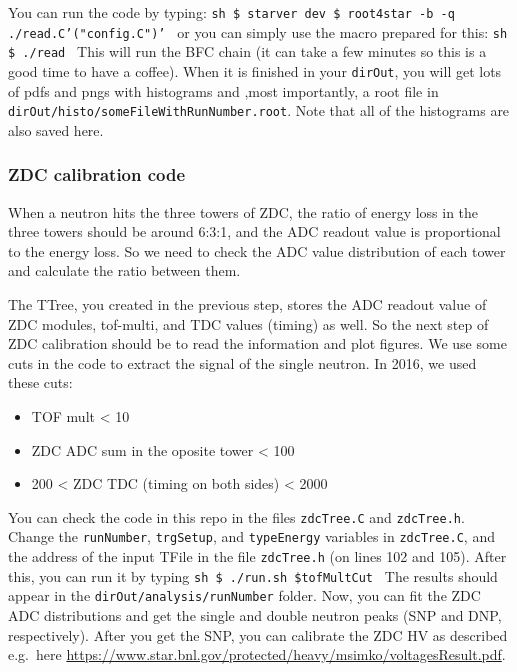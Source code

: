 You can run the code by typing:
\texttt{sh
\$ starver dev
\$ root4star -b -q ./read.C'("config.C")'
}
or you can simply use the macro prepared for this:
\texttt{sh
\$ ./read
}
This will run the BFC chain (it can take a few minutes so this is a good time to have a coffee). When it is finished
in your \texttt{dirOut}, you will get lots of pdfs and pngs with histograms and ,most importantly, a root file in
\texttt{dirOut/histo/someFileWithRunNumber.root}. Note that all of the histograms are also saved here.

\subsubsection{ZDC calibration code}\hypertarget{zdc-calibration-code}{}\label{zdc-calibration-code}

When a neutron hits the three towers of ZDC, the ratio of energy loss in the three towers should be 
around 6:3:1, and the ADC readout value is proportional to the energy loss. So we need to check the ADC value 
distribution of each tower and calculate the ratio between them.

The TTree, you created in the previous step, stores the ADC readout value of ZDC modules, tof-multi, and
TDC values (timing) as well. 
So the next step of ZDC calibration
should be to read the information and plot figures.
We use some cuts in the code to extract the signal of the single neutron. In 2016, we used these cuts:

\begin{itemize}
\item TOF mult \textless{} 10
\item ZDC ADC sum in the oposite tower \textless{} 100
\item 200 \textless{} ZDC TDC (timing on both sides) \textless{} 2000
\end{itemize}

You can check the code in this repo in the files
\texttt{zdcTree.C} and \texttt{zdcTree.h}. Change the \texttt{runNumber}, \texttt{trgSetup}, and \texttt{typeEnergy} variables in \texttt{zdcTree.C}, and
the address of the input TFile in the file \texttt{zdcTree.h} (on lines 102 and 105). After this, you can run it by typing
\texttt{sh
\$ ./run.sh \$tofMultCut
}
The results should appear in the \texttt{dirOut/analysis/runNumber} folder. Now, you can fit the ZDC ADC distributions
and get the single and double neutron peaks (SNP and DNP, respectively). After you get the SNP, you can calibrate
the ZDC HV as described e.g.\ here \href{https://www.star.bnl.gov/protected/heavy/msimko/voltagesResult.pdf}{https://www.star.bnl.gov/protected/heavy/msimko/voltagesResult.pdf}.


